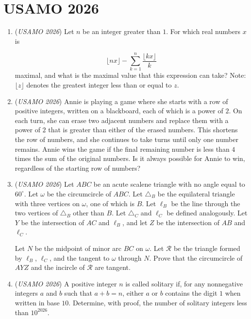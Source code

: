 \section{USAMO 2026}
        \begin{enumerate}
        	\item (\textit{USAMO 2026}) Let $n$ be an integer greater than $1$. For which real numbers $x$ is 

 \[\lfloor nx\rfloor-\sum_{k=1}^n\frac{\lfloor kx\rfloor}{k}\]
maximal, and what is the maximal value that this expression can take?
Note: $\lfloor z\rfloor$ denotes the greatest integer less than or equal to $z$.


 

	\item (\textit{USAMO 2026}) Annie is playing a game where she starts with a row of positive integers, written on a blackboard, each of which is a power of $2$. On each turn, she can erase two adjacent numbers and replace them with a power of $2$ that is greater than either of the erased numbers. This shortens the row of numbers, and she continues to take turns until only one number remains. Annie wins the game if the final remaining number is less than $4$ times the sum of the original numbers. Is it always possible for Annie to win, regardless of the starting row of numbers?


 

	\item (\textit{USAMO 2026}) Let $ABC$ be an acute scalene triangle with no angle equal to $60^\circ$. Let $\omega$ be the circumcircle of $ABC$. Let $\triangle_B$ be the equilateral triangle with three vertices on $\omega$, one of which is $B$. Let $\ell_B$ be the line through the two vertices of $\triangle_B$ other than $B$. Let $\triangle_C$ and $\ell_C$ be defined analogously. Let $Y$ be the intersection of $AC$ and $\ell_B$, and let $Z$ be the intersection of $AB$ and $\ell_C$.


 Let $N$ be the midpoint of minor arc $BC$ on $\omega$. Let $\mathcal{R}$ be the triangle formed by $\ell_B$, $\ell_C$, and the tangent to $\omega$ through $N$. Prove that the circumcircle of $AYZ$ and the incircle of $\mathcal{R}$ are tangent.


 

	\item (\textit{USAMO 2026}) A positive integer $n$ is called solitary if, for any nonnegative integers $a$ and $b$ such that $a+b=n$, either $a$ or $b$ contains the digit $1$ when written in base $10$. Determine, with proof, the number of solitary integers less than $10^{2026}$.



\end{enumerate}
